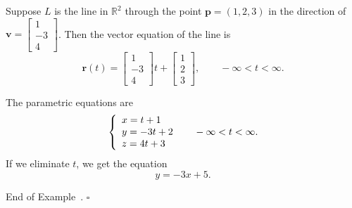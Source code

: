 \documentclass[10pt]{article}
\theoremstyle{definition}
\newtheorem{example}[theorem]{Example}
\renewenvironment{example}
{\begin{oldexample}}
  {\par\smallskip\hfill   End of Example~\theexample. $\square$    \par\end{oldexample}}
\newcommand{\1}[1]{\textbf{1}_{\left[#1\right]}} %
\def\R{\mathbb{R}} %
\begin{document}
\begin{example}
  Suppose $L$ is the line in $\R^{2}$ through the point $\mathbf{p}=(1,2,3)$ in the
  direction of $\mathbf{v}=
  \begin{bmatrix}
    1\\-3\\4
  \end{bmatrix}
  $. Then the vector equation of the line is
  \begin{equation*}
    \mathbf{r}(t) 
    =
    \begin{bmatrix}
      1\\-3\\4
    \end{bmatrix}
    t  +
    \begin{bmatrix}
      1\\2\\3
    \end{bmatrix}, \qquad -\infty<t<\infty.
  \end{equation*}

  The parametric equations are
  \begin{equation*}
    \left\{ \begin{array}{l@{}l}
        x=t+1 \\
        y=-3t+2 \\
        z=4t+3
      \end{array}\right.
    \qquad -\infty<t<\infty.
  \end{equation*}
  If we eliminate $t$, we get the equation
  \begin{equation*}
    y=-3x+5.
  \end{equation*}
\end{example}
\end{document}
